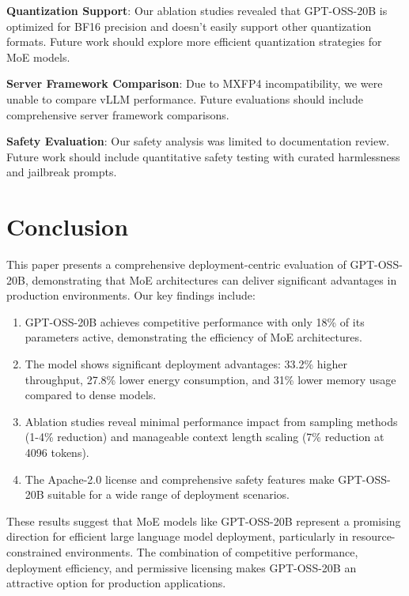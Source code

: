 \documentclass[11pt]{article}
\begin{document}
\textbf{Quantization Support}: Our ablation studies revealed that GPT-OSS-20B is optimized for BF16 precision and doesn't easily support other quantization formats. Future work should explore more efficient quantization strategies for MoE models.

\textbf{Server Framework Comparison}: Due to MXFP4 incompatibility, we were unable to compare vLLM performance. Future evaluations should include comprehensive server framework comparisons.

\textbf{Safety Evaluation}: Our safety analysis was limited to documentation review. Future work should include quantitative safety testing with curated harmlessness and jailbreak prompts.

\section{Conclusion}

This paper presents a comprehensive deployment-centric evaluation of GPT-OSS-20B, demonstrating that MoE architectures can deliver significant advantages in production environments. Our key findings include:

\begin{enumerate}
    \item GPT-OSS-20B achieves competitive performance with only 18\% of its parameters active, demonstrating the efficiency of MoE architectures.
    
    \item The model shows significant deployment advantages: 33.2\% higher throughput, 27.8\% lower energy consumption, and 31\% lower memory usage compared to dense models.
    
    \item Ablation studies reveal minimal performance impact from sampling methods (1-4\% reduction) and manageable context length scaling (7\% reduction at 4096 tokens).
    
    \item The Apache-2.0 license and comprehensive safety features make GPT-OSS-20B suitable for a wide range of deployment scenarios.
\end{enumerate}

These results suggest that MoE models like GPT-OSS-20B represent a promising direction for efficient large language model deployment, particularly in resource-constrained environments. The combination of competitive performance, deployment efficiency, and permissive licensing makes GPT-OSS-20B an attractive option for production applications.
\end{document}
